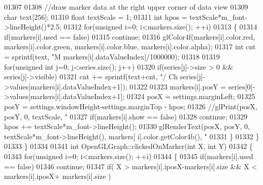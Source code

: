 \begin{DoxyCode}
{{{{{{{{{{01307 
01308         \textcolor{comment}{//draw marker data at the right upper corner of data view}
01309         \textcolor{keywordtype}{char} text[256];
01310         \textcolor{keywordtype}{float} textScale = 1;
01311         \textcolor{keywordtype}{int} hpos = textScale*m_font->lineHeight()*2.5;
01312         \textcolor{keywordflow}{for}(\textcolor{keywordtype}{unsigned} i=0; i<markers.size(); ++i)
01313         \{
01314             \textcolor{keywordflow}{if}(markers[i].used == \textcolor{keyword}{false})
01315                         \textcolor{keywordflow}{continue};
01316                     glColor4f(markers[i].color.red, markers[i].color.green, 
      markers[i].color.blue, markers[i].color.alpha);
01317                     \textcolor{keywordtype}{int} cnt = sprintf(text, \textcolor{stringliteral}{"M%
      markers[i].dataValueIndex]/1000000);
01318 
01319                     \textcolor{keywordflow}{for}(\textcolor{keywordtype}{unsigned} \textcolor{keywordtype}{int} j=0; j<series.size(); j++)
01320                         \textcolor{keywordflow}{if}(series[j]->size > 0 && series[j]->visible)
01321                             cnt += sprintf(text+cnt, \textcolor{stringliteral}{"/ Ch %
      series[j]->values[markers[i].dataValueIndex+1]);
01322 
01323                     markers[i].posY = series[0]->values[markers[i].dataValueIndex+1];
01324                     posX = settings.marginLeft;
01325                     posY = settings.windowHeight-settings.marginTop - hpos;
01326                     \textcolor{comment}{//glPrint(posX, posY, 0, textScale, "%
01327                     \textcolor{keywordflow}{if}(markers[i].show == \textcolor{keyword}{false})
01328                         \textcolor{keywordflow}{continue};
01329                     hpos += textScale*m_font->lineHeight();
01330             glRenderText(posX, posY, 0, textScale*m_font->lineHeight(), markers[
      i].color.getColor4b(), \textcolor{stringliteral}{"%
01331         \}
01332     \}
01333 \}
01334 
01341 \textcolor{keywordtype}{int} OpenGLGraph::clickedOnMarker(\textcolor{keywordtype}{int} X, \textcolor{keywordtype}{int} Y)
01342 \{
01343     \textcolor{keywordflow}{for}(\textcolor{keywordtype}{unsigned} i=0; i<markers.size(); ++i)
01344     \{
01345         \textcolor{keywordflow}{if}(markers[i].used == \textcolor{keyword}{false})
01346             \textcolor{keywordflow}{continue};
01347         \textcolor{keywordflow}{if}( X > markers[i].iposX-markers[i].size &&  X < markers[i].iposX+
      markers[i].size )
}}}}}}}}}}}}}}
\end{DoxyCode}
